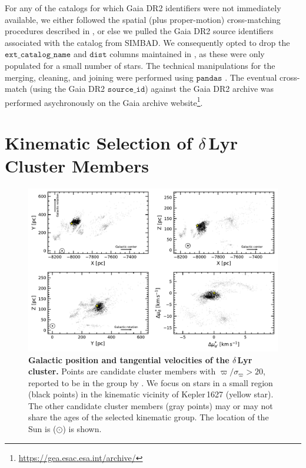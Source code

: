 \documentclass[12pt,modern,twocolumn,tighten]{aastex63}
\begin{document}
For any of the catalogs for which Gaia DR2 identifiers were not
immediately available, we either followed the spatial (plus
proper-motion) cross-matching procedures described in
\citet{bouma_cdipsI_2019}, or else we pulled the Gaia DR2 source
identifiers associated with the catalog from SIMBAD.  We consequently
opted to drop the $\texttt{ext\_catalog\_name}$ and $\texttt{dist}$
columns maintained in \citet{bouma_cdipsI_2019}, as these were only
populated for a small number of stars.
The technical manipulations for the merging, cleaning, and joining
were performed using $\texttt{pandas}$
\citep{mckinney-proc-scipy-2010}.  The eventual cross-match (using the
Gaia DR2 $\texttt{source\_id}$) against the Gaia DR2 archive was
performed asychronously on the Gaia archive
website\footnote{\url{https://gea.esac.esa.int/archive/}}.


\section{Kinematic Selection of $\delta$\,Lyr Cluster Members}
\label{app:kinematicselection}

\begin{figure}[t]
	\begin{center}
		\leavevmode
		\includegraphics[width=1\textwidth]{f1.pdf}
	\end{center}
	\vspace{-0.7cm}
	\caption{
    {\bf Galactic position and tangential velocities of the
    $\delta$\,Lyr cluster.}
    Points are candidate cluster members with $\varpi/\sigma_\varpi >
    20$, reported to be in the group by
    \citet{kounkel_untangling_2019}.  We focus on stars in a small
    region (black points) in the kinematic vicinity of Kepler\,1627
    (yellow star).  The other candidate cluster members (gray points)
    may or may not share the ages of the selected kinematic group.
    The location of the Sun is ($\odot$) is shown.
		\label{fig:XYZvtang}
	}
\end{figure}
\end{document}
